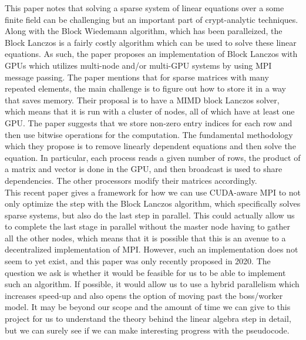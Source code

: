\documentclass[11pt,twocolumn]{article}
\begin{document}
This paper notes that solving a sparse system of linear equations over a some finite field can be challenging but an important part of crypt-analytic techniques. Along with the Block Wiedemann algorithm, which has been paralleized, the Block Lanczos is a fairly costly algorithm which can be used to solve these linear equations. As such, the paper proposes an implementation of Block Lanczos with GPUs which utilizes multi-node and/or multi-GPU systems by using MPI message passing. The paper mentions that for sparse matrices with many repeated elements, the main challenge is to figure out how to store it in a way that saves memory. Their proposal is to have a MIMD block Lanczos solver, which means that it is run with a cluster of nodes, all of which have at least one GPU. The paper suggests that we store non-zero entry indices for each row and then use bitwise operations for the computation. The fundamental methodology which they propose is to remove linearly dependent equations and then solve the equation. In particular, each process reads a given number of rows, the product of a matrix and vector is done in the GPU, and then broadcast is used to share dependencies. The other processors modify their matrices accordingly. \\
\indent This recent paper gives a framework for how we can use CUDA-aware MPI to not only optimize the step with the Block Lanczos algorithm, which specifically solves sparse systems, but also do the last step in parallel. This could actually allow us to complete the last stage in parallel without the master node having to gather all the other nodes, which means that it is possible that this is an avenue to a decentralized implementation of MPI. However, such an implementation does not seem to yet exist, and this paper was only recently proposed in 2020. The question we ask is whether it would be feasible for us to be able to implement such an algorithm. If possible, it would allow us to use a hybrid parallelism which increases speed-up and also opens the option of moving past the boss/worker model. It may be beyond our scope and the amount of time we can give to this project for us to understand the theory behind the linear algebra step in detail, but we can surely see if we can make interesting progress with the pseudocode. \\
\end{document}
